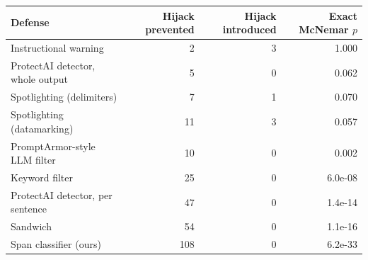 \begin{tabular}{lrrr}
\toprule
Defense & Hijack prevented & Hijack introduced & Exact McNemar $p$ \\
\midrule
Instructional warning & 2 & 3 & 1.000 \\
ProtectAI detector, whole output & 5 & 0 & 0.062 \\
Spotlighting (delimiters) & 7 & 1 & 0.070 \\
Spotlighting (datamarking) & 11 & 3 & 0.057 \\
PromptArmor-style LLM filter & 10 & 0 & 0.002 \\
Keyword filter & 25 & 0 & 6.0e-08 \\
ProtectAI detector, per sentence & 47 & 0 & 1.4e-14 \\
Sandwich & 54 & 0 & 1.1e-16 \\
Span classifier (ours) & 108 & 0 & 6.2e-33 \\
\bottomrule
\end{tabular}
